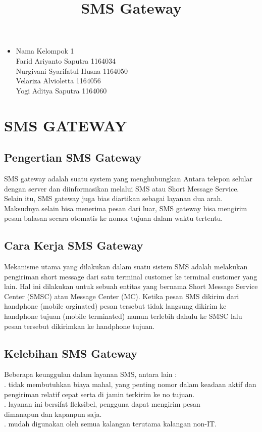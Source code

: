 \documentclass[12pt,a4paper]{article}
\begin{document}
\title{SMS Gateway}
\maketitle

\begin{itemize}
\item
Nama Kelompok 1\\
Farid Ariyanto Saputra 1164034\\
Nurgivani Syarifatul Husna 1164050\\
Velariza Alvioletta 1164056\\
Yogi Aditya Saputra 1164060 \\
\end{itemize}

\section{SMS GATEWAY}
\subsection{Pengertian SMS Gateway}
SMS gateway adalah suatu system yang menghubungkan Antara telepon selular dengan server dan diinformasikan melalui SMS atau Short Message Service. Selain itu, SMS gateway juga bias diartikan sebagai layanan dua arah. Maksudnya selain bisa menerima pesan dari luar,  SMS gateway bisa mengirim pesan balasan secara otomatis ke nomor tujuan dalam waktu tertentu.
\subsection{Cara Kerja SMS Gateway}
Mekanisme utama yang dilakukan dalam suatu sistem SMS adalah melakukan pengiriman short message dari satu terminal customer ke terminal customer yang lain. Hal ini dilakukan untuk sebuah entitas yang bernama  Short Message Service Center (SMSC) atau Message Center (MC). Ketika pesan SMS dikirim dari handphone (mobile orginated) pesan tersebut tidak langsung dikirim ke handphone tujuan (mobile terminated) namun terlebih dahulu ke SMSC lalu pesan tersebut dikirimkan ke handphone tujuan.
\subsection{Kelebihan SMS Gateway}
Beberapa keunggulan dalam layanan SMS, antara lain : \\
. tidak membutuhkan biaya mahal, yang penting nomor dalam keadaan \indent aktif dan pengiriman relatif cepat serta di jamin terkirim ke no tujuan. \\
. layanan ini bersifat fleksibel, pengguna dapat mengirim pesan\\ \indent dimanapun dan kapanpun saja. \\
. mudah digunakan oleh semua kalangan terutama kalangan non-IT. \\
\end{document}
